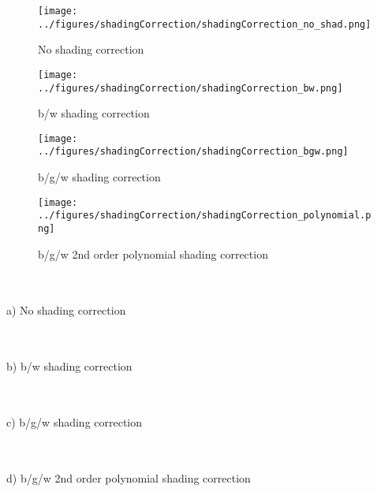 \documentclass[a4paper]{proc}
\begin{document}
\begin{figure*}
	\centering
	\begin{subfigure}{\textwidth}
		\centering
		\texttt{[image: ../figures/shadingCorrection/shadingCorrection\_no\_shad.png]}
		\caption{No shading correction}
	\end{subfigure}
	\begin{subfigure}{\textwidth}
		\centering
		\texttt{[image: ../figures/shadingCorrection/shadingCorrection\_bw.png]}
		\caption{b/w shading correction}
	\end{subfigure}
	\begin{subfigure}{\textwidth}
		\centering
		\texttt{[image: ../figures/shadingCorrection/shadingCorrection\_bgw.png]}
		\caption{b/g/w shading correction}
	\end{subfigure}
		\begin{subfigure}{\textwidth}
		\centering
		\texttt{[image: ../figures/shadingCorrection/shadingCorrection\_polynomial.png]}
		\caption{b/g/w 2nd order polynomial shading correction}
	\end{subfigure}
	\caption{Shading correction applied on reference images from a test set. A training set was used to train the shading correction.}
	\label{fig:shadingCorr_bgw}
\end{figure*}

\begin{table*}
	\centering
	\begin{tabular}{c|c|c}
		
	\end{tabular}
	\\
	\vspace{.25cm}
	a) No shading correction
	\\\vspace{.5cm}
	\begin{tabular}{c|c|c}
		
	\end{tabular}
	\\
	\vspace{.25cm}
	b) b/w shading correction
	\\\vspace{.5cm}
	\begin{tabular}{c|c|c}
		
	\end{tabular}
	\\
	\vspace{.25cm}
	c) b/g/w shading correction
	\\\vspace{.5cm}
	\begin{tabular}{c|c|c}
		
	\end{tabular}
	\\
	\vspace{.25cm}
	d) b/g/w 2nd order polynomial shading correction
	\caption{Within pixel and between pixel variance of the shading corrected reference images. Values stated are the quartiles from 20 repeats of the experiment.}
	\label{table:bgw_anova}
\end{table*}
\end{document}
